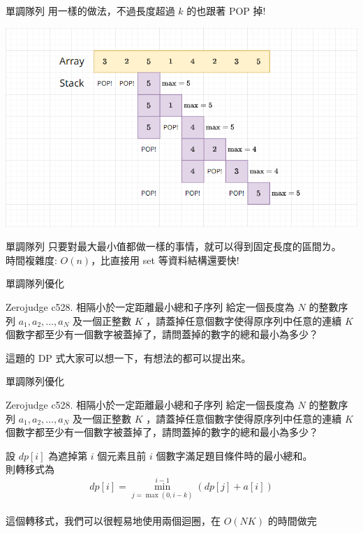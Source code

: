 \documentclass[aspectratio=169]{beamer}
\begin{document}
\begin{frame}[fragile]{單調隊列}
    用一樣的做法，不過長度超過 $k$ 的也跟著 POP 掉!
    \begin{center}
        \includegraphics[scale=0.45]{images/sliding_max.png}
    \end{center}
\end{frame}

\begin{frame}[fragile]{單調隊列}
    只要對最大最小值都做一樣的事情，就可以得到固定長度的區間ㄌ。 \\
    時間複雜度: $O(n)$，比直接用 set 等資料結構還要快!
\end{frame}

\begin{frame}[fragile]{單調隊列優化}
    \begin{block}{Zerojudge c528. 相隔小於一定距離最小總和子序列}
    給定一個長度為 $N$ 的整數序列 $a_1,a_2,\dots,a_N$
    及一個正整數 $K$ ，請蓋掉任意個數字使得原序列中任意的連續 $K$ 個數字都至少有一個數字被蓋掉了，請問蓋掉的數字的總和最小為多少？
    \end{block} \pause
    這題的 DP 式大家可以想一下，有想法的都可以提出來。
\end{frame}

\begin{frame}[fragile]{單調隊列優化}
    \begin{block}{Zerojudge c528. 相隔小於一定距離最小總和子序列}
    給定一個長度為 $N$ 的整數序列 $a_1,a_2,\dots,a_N$
    及一個正整數 $K$ ，請蓋掉任意個數字使得原序列中任意的連續 $K$ 個數字都至少有一個數字被蓋掉了，請問蓋掉的數字的總和最小為多少？
    \end{block} 
    設 $dp[i]$ 為遮掉第 $i$ 個元素且前 $i$ 個數字滿足題目條件時的最小總和。 \\
    則轉移式為
        $$dp[i] = \min_{j=\max(0,i-k)}^{i-1}(dp[j]+a[i])$$ \\
    這個轉移式，我們可以很輕易地使用兩個迴圈，在 $O(NK)$ 的時間做完
\end{frame}
\end{document}
